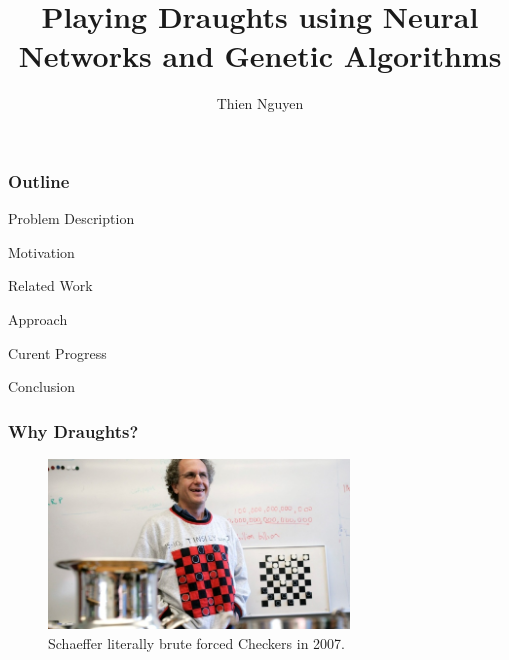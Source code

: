 \documentclass[aspectratio=169]{beamer}
\title[NN and GA To Play Draughts] %
	{Playing Draughts using Neural Networks and Genetic Algorithms}
\author[T. Nguyen] %
	{Thien Nguyen}
\institute[Durham] %
	{
	Department of Computer Science\\
	Durham University
	}
\begin{document}
\pgfplotsset{compat=1.15}

\frame{\titlepage}

\begin{frame}

  \frametitle{Outline}
	\begin{block}{Problem Description}
	 \end{block}
	\begin{block}{Motivation}
	\end{block}
	\begin{block}{Related Work}
	\end{block}
	\begin{block}{Approach}
	\end{block}
	\begin{block}{Curent Progress}
	\end{block}
	\begin{block}{Conclusion}
	\end{block}
	  
  
\end{frame}

\begin{frame}
	\frametitle{Why Draughts?}
	\begin{figure}[ht!]
		\centering
		\includegraphics[width=80mm]{schaeffer.jpg}
		\caption{Schaeffer literally brute forced Checkers in 2007. \cite{schaeffer_solving_1996}}
	\end{figure}
\end{frame}
\end{document}
